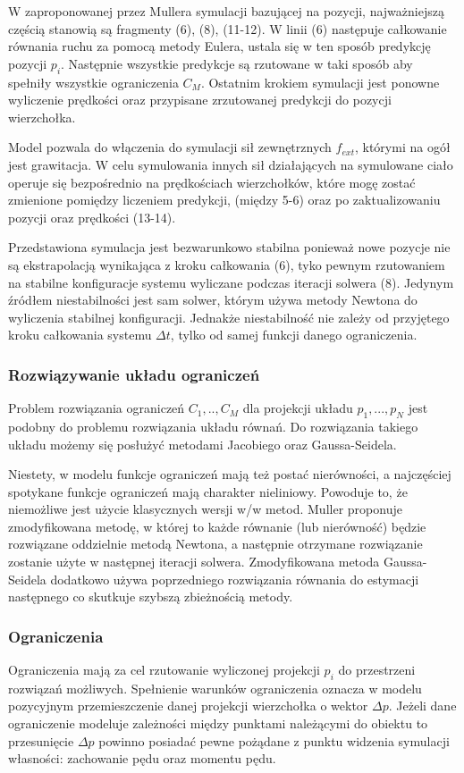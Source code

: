 W zaproponowanej przez Mullera symulacji bazującej na pozycji, najważniejszą częścią stanowią są
fragmenty (6), (8), (11-12). W linii (6) następuje całkowanie równania ruchu za 
pomocą metody Eulera, ustala się w ten sposób predykcję pozycji $p_i$. Następnie
wszystkie predykcje są rzutowane w taki sposób aby spełniły wszystkie
ograniczenia $C_M$. Ostatnim krokiem symulacji jest ponowne wyliczenie
prędkości oraz przypisane zrzutowanej predykcji do pozycji wierzchołka.

Model pozwala do włączenia do symulacji sił zewnętrznych $f_{ext}$, którymi na ogół jest
grawitacja. W celu symulowania innych sił działających na symulowane ciało
operuje się bezpośrednio na prędkościach wierzchołków, które mogę zostać
zmienione pomiędzy liczeniem predykcji, (między 5-6) oraz po
zaktualizowaniu pozycji oraz prędkości (13-14).

Przedstawiona symulacja jest bezwarunkowo stabilna ponieważ nowe pozycje nie są
ekstrapolacją wynikająca z kroku całkowania (6), tyko pewnym rzutowaniem na
stabilne konfiguracje systemu wyliczane podczas iteracji solwera (8). Jedynym
źródłem niestabilności jest sam solwer, którym używa metody Newtona do wyliczenia
stabilnej konfiguracji. Jednakże niestabilność nie zależy od przyjętego kroku
całkowania systemu $\Delta t$, tylko od samej funkcji danego
ograniczenia\cite{pbdyn}.

\subsubsection{Rozwiązywanie układu ograniczeń}
Problem rozwiązania ograniczeń $C_1, .., C_M$ dla projekcji układu $p_1, ..., p_N$
jest podobny do problemu rozwiązania układu równań. Do rozwiązania takiego
układu możemy się posłużyć metodami Jacobiego oraz Gaussa-Seidela. 

Niestety, w modelu funkcje ograniczeń mają też postać nierówności, a
najczęściej spotykane funkcje ograniczeń mają charakter nieliniowy. Powoduje to,
że niemożliwe jest użycie klasycznych wersji w/w metod. Muller proponuje
zmodyfikowana metodę, w której to każde równanie (lub nierówność) będzie rozwiązane
oddzielnie metodą Newtona, a następnie otrzymane rozwiązanie zostanie użyte w
następnej iteracji solwera. Zmodyfikowana metoda Gaussa-Seidela dodatkowo używa
poprzedniego rozwiązania równania do estymacji następnego co skutkuje szybszą
zbieżnością metody\cite{pbdyn}.

\subsubsection{Ograniczenia}
Ograniczenia mają za cel rzutowanie wyliczonej projekcji $p_i$ do przestrzeni
rozwiązań możliwych. Spełnienie warunków ograniczenia oznacza w 
modelu pozycyjnym przemieszczenie danej projekcji wierzchołka o wektor $\Delta p$.
Jeżeli dane ograniczenie modeluje zależności między punktami należącymi do
obiektu to przesunięcie $\Delta p$ powinno posiadać
pewne pożądane z punktu widzenia symulacji własności: zachowanie pędu oraz
momentu pędu.


